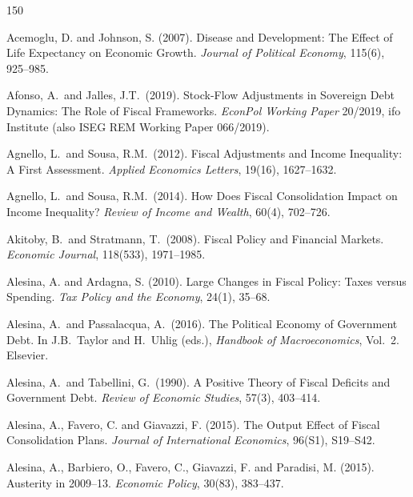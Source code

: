 \documentclass[11pt,a4paper]{article}
\begin{document}

\begin{thebibliography}{150}
\setlength{\itemsep}{0.15em}

 Acemoglu, D. and Johnson, S. (2007). Disease and Development: The Effect of Life Expectancy on Economic Growth. \textit{Journal of Political Economy}, 115(6), 925--985.

 Afonso, A.\ and Jalles, J.T.\ (2019). Stock-Flow Adjustments in Sovereign Debt Dynamics: The Role of Fiscal Frameworks. \textit{EconPol Working Paper} 20/2019, ifo Institute (also ISEG REM Working Paper 066/2019).

 Agnello, L.\ and Sousa, R.M.\ (2012). Fiscal Adjustments and Income Inequality: A First Assessment. \textit{Applied Economics Letters}, 19(16), 1627--1632.

 Agnello, L.\ and Sousa, R.M.\ (2014). How Does Fiscal Consolidation Impact on Income Inequality? \textit{Review of Income and Wealth}, 60(4), 702--726.

 Akitoby, B.\ and Stratmann, T.\ (2008). Fiscal Policy and Financial Markets. \textit{Economic Journal}, 118(533), 1971--1985.

 Alesina, A. and Ardagna, S. (2010). Large Changes in Fiscal Policy: Taxes versus Spending. \textit{Tax Policy and the Economy}, 24(1), 35--68.

 Alesina, A.\ and Passalacqua, A.\ (2016). The Political Economy of Government Debt. In J.B.\ Taylor and H.\ Uhlig (eds.), \textit{Handbook of Macroeconomics}, Vol.\ 2. Elsevier.

 Alesina, A.\ and Tabellini, G.\ (1990). A Positive Theory of Fiscal Deficits and Government Debt. \textit{Review of Economic Studies}, 57(3), 403--414.

 Alesina, A., Favero, C. and Giavazzi, F. (2015). The Output Effect of Fiscal Consolidation Plans. \textit{Journal of International Economics}, 96(S1), S19--S42.

 Alesina, A., Barbiero, O., Favero, C., Giavazzi, F. and Paradisi, M. (2015). Austerity in 2009--13. \textit{Economic Policy}, 30(83), 383--437.


\end{thebibliography}
\end{document}
